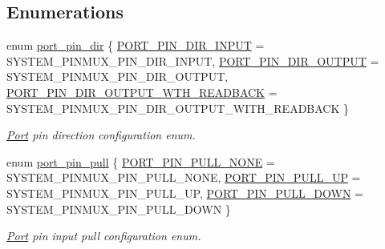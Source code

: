 \subsection*{Enumerations}
\begin{DoxyCompactItemize}
\item 
enum \hyperlink{group__asfdoc__sam0__port__group_gabe12893c067f9b011ece79c1bf1b128a}{port\+\_\+pin\+\_\+dir} \{ \hyperlink{group__asfdoc__sam0__port__group_ggabe12893c067f9b011ece79c1bf1b128aacfdf36142de0378cd9927b9c00e2f7a6}{P\+O\+R\+T\+\_\+\+P\+I\+N\+\_\+\+D\+I\+R\+\_\+\+I\+N\+P\+U\+T} = S\+Y\+S\+T\+E\+M\+\_\+\+P\+I\+N\+M\+U\+X\+\_\+\+P\+I\+N\+\_\+\+D\+I\+R\+\_\+\+I\+N\+P\+U\+T, 
\hyperlink{group__asfdoc__sam0__port__group_ggabe12893c067f9b011ece79c1bf1b128aaa2cda8b4095bfaf6f354f113947a3463}{P\+O\+R\+T\+\_\+\+P\+I\+N\+\_\+\+D\+I\+R\+\_\+\+O\+U\+T\+P\+U\+T} = S\+Y\+S\+T\+E\+M\+\_\+\+P\+I\+N\+M\+U\+X\+\_\+\+P\+I\+N\+\_\+\+D\+I\+R\+\_\+\+O\+U\+T\+P\+U\+T, 
\hyperlink{group__asfdoc__sam0__port__group_ggabe12893c067f9b011ece79c1bf1b128aae3d3fdfe355c7727ea36948da3b848ad}{P\+O\+R\+T\+\_\+\+P\+I\+N\+\_\+\+D\+I\+R\+\_\+\+O\+U\+T\+P\+U\+T\+\_\+\+W\+T\+H\+\_\+\+R\+E\+A\+D\+B\+A\+C\+K} = S\+Y\+S\+T\+E\+M\+\_\+\+P\+I\+N\+M\+U\+X\+\_\+\+P\+I\+N\+\_\+\+D\+I\+R\+\_\+\+O\+U\+T\+P\+U\+T\+\_\+\+W\+I\+T\+H\+\_\+\+R\+E\+A\+D\+B\+A\+C\+K
 \}
\begin{DoxyCompactList}\small\item\em \hyperlink{struct_port}{Port} pin direction configuration enum. \end{DoxyCompactList}\item 
enum \hyperlink{group__asfdoc__sam0__port__group_ga1f47828261f5b7ac5f864b42981a2004}{port\+\_\+pin\+\_\+pull} \{ \hyperlink{group__asfdoc__sam0__port__group_gga1f47828261f5b7ac5f864b42981a2004ab178b34fb381794e7f550b14ff08a302}{P\+O\+R\+T\+\_\+\+P\+I\+N\+\_\+\+P\+U\+L\+L\+\_\+\+N\+O\+N\+E} = S\+Y\+S\+T\+E\+M\+\_\+\+P\+I\+N\+M\+U\+X\+\_\+\+P\+I\+N\+\_\+\+P\+U\+L\+L\+\_\+\+N\+O\+N\+E, 
\hyperlink{group__asfdoc__sam0__port__group_gga1f47828261f5b7ac5f864b42981a2004a6505b9a836a818d1f2c8a248b9ac8073}{P\+O\+R\+T\+\_\+\+P\+I\+N\+\_\+\+P\+U\+L\+L\+\_\+\+U\+P} = S\+Y\+S\+T\+E\+M\+\_\+\+P\+I\+N\+M\+U\+X\+\_\+\+P\+I\+N\+\_\+\+P\+U\+L\+L\+\_\+\+U\+P, 
\hyperlink{group__asfdoc__sam0__port__group_gga1f47828261f5b7ac5f864b42981a2004a2665866a5f05266cc8fa78da60ebc19d}{P\+O\+R\+T\+\_\+\+P\+I\+N\+\_\+\+P\+U\+L\+L\+\_\+\+D\+O\+W\+N} = S\+Y\+S\+T\+E\+M\+\_\+\+P\+I\+N\+M\+U\+X\+\_\+\+P\+I\+N\+\_\+\+P\+U\+L\+L\+\_\+\+D\+O\+W\+N
 \}
\begin{DoxyCompactList}\small\item\em \hyperlink{struct_port}{Port} pin input pull configuration enum. \end{DoxyCompactList}\end{DoxyCompactItemize}
